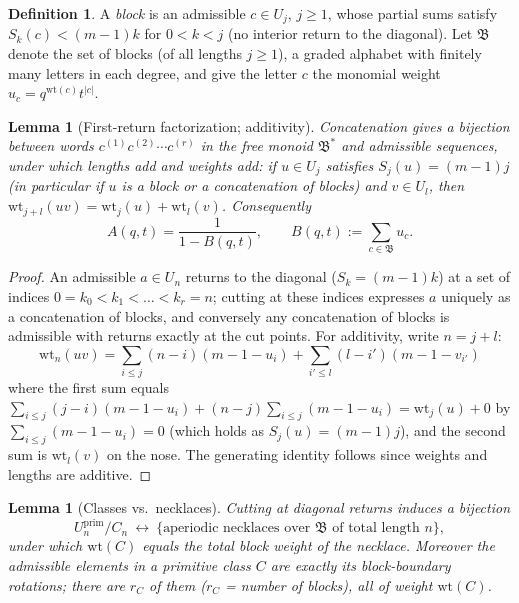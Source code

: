 \documentclass[11pt]{amsart}
\newtheorem{lemma}[theorem]{Lemma}
\theoremstyle{definition}
\newtheorem{definition}[theorem]{Definition}
\newcommand{\wt}{\mathrm{wt}}
\newcommand{\prim}{\mathrm{prim}}
\begin{document}
\begin{definition}
A \emph{block} is an admissible $c\in U_j$, $j\ge1$, whose partial sums satisfy $S_k(c)<(m-1)k$ for $0<k<j$ (no interior return to the diagonal). Let $\mathfrak B$ denote the set of blocks (of all lengths $j\ge1$), a graded alphabet with finitely many letters in each degree, and give the letter $c$ the monomial weight $u_c=q^{\wt(c)}t^{|c|}$.
\end{definition}

\begin{lemma}[First-return factorization; additivity]\label{lem:blocks}
Concatenation gives a bijection between words $c^{(1)}c^{(2)}\cdots c^{(r)}$ in the free monoid $\mathfrak B^*$ and admissible sequences, under which lengths add and weights add: if $u\in U_j$ satisfies $S_j(u)=(m-1)j$ (in particular if $u$ is a block or a concatenation of blocks) and $v\in U_l$, then $\wt_{j+l}(uv)=\wt_j(u)+\wt_l(v)$. Consequently
\[
A(q,t)=\frac1{1-B(q,t)},\qquad B(q,t):=\sum_{c\in\mathfrak B}u_c .
\]
\end{lemma}

\begin{proof}
An admissible $a\in U_n$ returns to the diagonal ($S_k=(m-1)k$) at a set of indices $0=k_0<k_1<\dots<k_r=n$; cutting at these indices expresses $a$ uniquely as a concatenation of blocks, and conversely any concatenation of blocks is admissible with returns exactly at the cut points. For additivity, write $n=j+l$:
\[
\wt_n(uv)=\sum_{i\le j}(n-i)(m-1-u_i)+\sum_{i'\le l}(l-i')(m-1-v_{i'})
\]
where the first sum equals $\sum_{i\le j}(j-i)(m-1-u_i)+(n-j)\sum_{i\le j}(m-1-u_i)=\wt_j(u)+0$ by $\sum_{i\le j}(m-1-u_i)=0$ (which holds as $S_j(u)=(m-1)j$), and the second sum is $\wt_l(v)$ on the nose. The generating identity follows since weights and lengths are additive.
\end{proof}

\begin{lemma}[Classes vs.\ necklaces]\label{lem:classes}
Cutting at diagonal returns induces a bijection
\[
U^{\prim}_n/C_n\ \longleftrightarrow\ \{\text{aperiodic necklaces over }\mathfrak B\text{ of total length }n\},
\]
under which $\wt(C)$ equals the total block weight of the necklace. Moreover the admissible elements in a primitive class $C$ are exactly its block-boundary rotations; there are $r_C$ of them ($r_C$ = number of blocks), all of weight $\wt(C)$.
\end{lemma}
\end{document}
